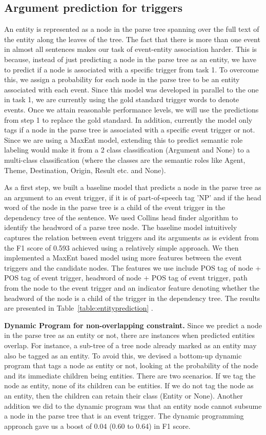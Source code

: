 \subsection{Argument prediction for triggers}
An entity is represented as a node in the parse tree spanning over the full text of the entity along the leaves of the tree. The fact that there is more than one event in almost all sentences makes our task of event-entity association harder. This is because, instead of just predicting a node in the parse tree as an entity, we have to predict if a node is associated with a specific trigger from task 1. To overcome this, we assign a probability for each node in the parse tree to be an entity associated with each event. Since this model was developed in parallel to the one in task 1, we are currently using the gold standard trigger words to denote events. Once we attain reasonable performance levels, we will use the predictions from step 1 to replace the gold standard. In addition, currently the model only tags if a node in the parse tree is associated with a specific event trigger or not. Since we are using a MaxEnt model, extending this to predict semantic role labeling would make it from a 2 class classification (Argument and None) to a multi-class classification (where the classes are the semantic roles like Agent, Theme, Destination, Origin, Result etc. and None).

As a first step, we built a baseline model that predicts a node in the parse tree as an argument to an event trigger, if it is of part-of-speech tag 'NP' and if the head word of the node in the parse tree is a child of the event trigger in the dependency tree of the sentence. We used Collins head finder algorithm to identify the headword of a parse tree node. The baseline model intuitively captures the relation between event triggers and its arguments as is evident from the F1 score of 0.593 achieved using a relatively simple approach. We then implemented a MaxEnt based model using more features between the event triggers and the candidate nodes. The features we use include POS tag of node + POS tag of event trigger, headword of node + POS tag of event trigger, path from the node to the event trigger and an indicator feature denoting whether the headword of the node is a child of the trigger in the dependency tree. The results are presented in Table~\ref{table:entityprediction} .

{\bf Dynamic Program for non-overlapping constraint.} Since we predict a node in the parse tree as an entity or not, there are instances when predicted entities overlap. For instance, a sub-tree of a tree node already marked as an entity may also be tagged as an entity. To avoid this, we devised a bottom-up dynamic program that tags a node as entity or not, looking at the probability of the node and its immediate children being entities. There are two scenarios. If we tag the node as entity, none of its children can be entities. If we do not tag the node as an entity, then the children can retain their class (Entity or None). Another addition we did to the dynamic program was that an entity node cannot subsume a node in the parse tree that is an event trigger. The dynamic programming approach gave us a boost of 0.04 (0.60 to 0.64) in F1 score. 